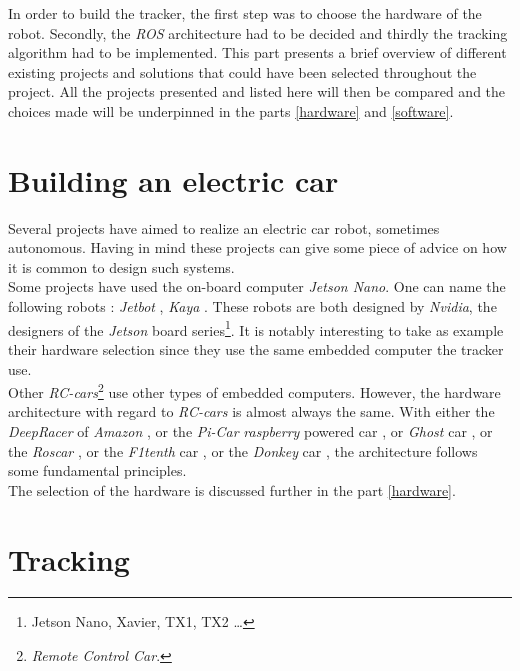 		In order to build the tracker, the first step was to choose the
		hardware of the robot. Secondly, the \textit{ROS} architecture had to be decided
		and thirdly the tracking algorithm had to be implemented. This part 
		presents a brief overview of different existing projects and solutions 
		that could have been selected throughout the project. All the projects
		presented and listed here will then be compared and the choices
		made will be underpinned in the parts \vref{hardware} and \vref{software}.
		
		\section{Building an electric car}
		
		Several projects have aimed to realize an electric car robot, sometimes autonomous. 
		Having in mind these projects can give some piece of advice on how it is common 
		to design such systems.
		\\\indent Some projects have used the on-board computer \textit{Jetson Nano}. 
		One can name the following robots : \textit{Jetbot} \cite{jetbot}, \textit{Kaya} \cite{kaya}.
		These robots are both designed by \textit{Nvidia}, the designers of the 
		\textit{Jetson} board series\footnote{Jetson Nano, Xavier, TX1, TX2 \dots}. It 
		is notably interesting to take as example their hardware selection since they
		use the same embedded computer the tracker use.
		\\\indent Other \textit{RC-cars}\footnote{\textit{Remote Control Car}.} use other types of embedded computers.
		However, the hardware architecture with regard to \textit{RC-cars} is 
		almost always the same. With either the \textit{DeepRacer} of \textit{Amazon} \cite{deepracer}, or
		the \textit{Pi-Car} \textit{raspberry} powered car \cite{rasp}, or 
		\textit{Ghost} car \cite{ghost}, or the \textit{Roscar} \cite{roscar}, or
		the \textit{F1tenth} car \cite{f1tenth}, or the \textit{Donkey} car \cite{donkey}, the architecture
		follows some fundamental principles.
		\\\indent The selection of the hardware is discussed further in the part \vref{hardware}.
		
		\section{Tracking}
		
